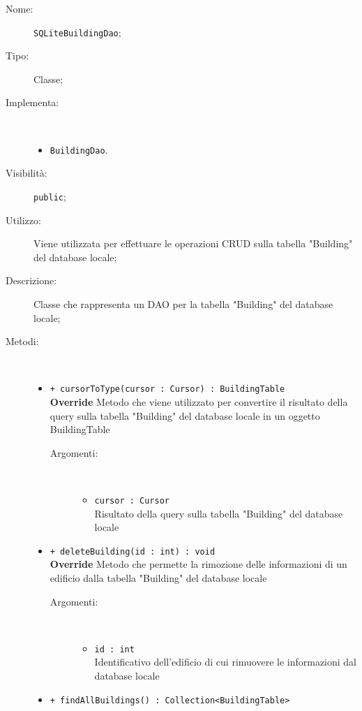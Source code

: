 \documentclass[../DefinizioneDiProdotto.tex]{subfiles}
\begin{document}
    \begin{description}
\item[Nome:] \texttt{SQLiteBuildingDao};
\item[Tipo:] Classe;
\item[Implementa:] \
\begin{itemize}
\item \texttt{BuildingDao}.

\end{itemize}
\item[Visibilità:] \texttt{public};
\item[Utilizzo:] Viene utilizzata per effettuare le operazioni CRUD sulla tabella "Building" del database locale;
\item[Descrizione:] Classe che rappresenta un DAO per la tabella "Building" del database locale;
\item[Metodi:] \
\begin{itemize}
\item \texttt{+ cursorToType(cursor : Cursor) : BuildingTable}\\
\textbf{Override} Metodo che viene utilizzato per convertire il risultato della query sulla tabella "Building" del database locale in un oggetto BuildingTable
 \begin{description}
\item[Argomenti:] \
\begin{itemize}
\item \texttt{cursor : Cursor}\\
Risultato della query sulla tabella "Building" del database locale\end{itemize}
\end{description}
\item \texttt{+ deleteBuilding(id : int) : void}\\
\textbf{Override} Metodo che permette la rimozione delle informazioni di un edificio dalla tabella "Building" del database locale 
 \begin{description}
\item[Argomenti:] \
\begin{itemize}
\item \texttt{id : int}\\
Identificativo dell'edificio di cui rimuovere le informazioni dal database locale\end{itemize}
\end{description}
\item \texttt{+ findAllBuildings() : Collection<BuildingTable>}\\

\end{itemize}
\end{description}
\end{document}

